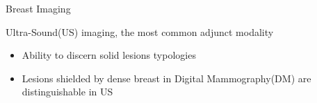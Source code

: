 \begin{frame}{Breast Imaging}
  \begin{block}{\small Ultra-Sound(US) imaging, the most common adjunct modality}\footnotesize
    \begin{itemize}
    \item Ability to discern solid lesions typologies
    \item Lesions shielded by dense breast in Digital Mammography(DM) are distinguishable in US
    \end{itemize}
  \end{block}

  \begin{figure}%
     \centering
     \hspace*{\fill}%
     \hfill%
     \hfill%
       \hspace*{\fill}%
    \label{fig:shield}%
  \end{figure}

\end{frame}

